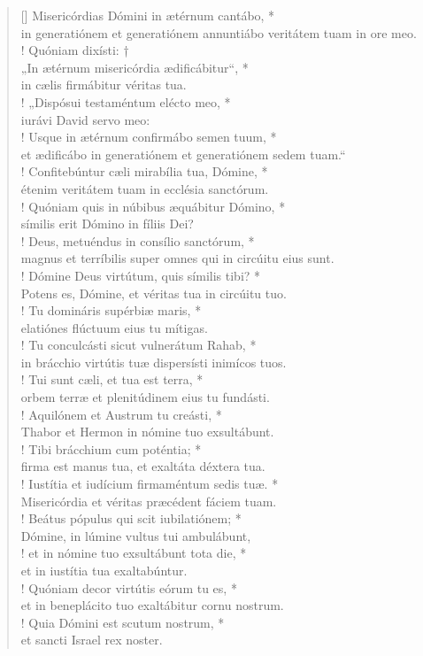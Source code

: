 \begin{verse}[\versewidth]
Misericórdias Dómini in ætérnum cantábo, *\\
in generatiónem et generatiónem annuntiábo veritátem tuam in ore meo.\\!
\vin Quóniam dixísti: †\\
\vin „In ætérnum misericórdia ædificábitur“, *\\
\vin in cælis firmábitur véritas tua.\\!
„Dispósui testaméntum elécto meo, *\\
iurávi David servo meo:\\!
\vin Usque in ætérnum confirmábo semen tuum, *\\
\vin et ædificábo in generatiónem et generatiónem sedem tuam.“\\!
Confitebúntur cæli mirabília tua, Dómine, *\\
étenim veritátem tuam in ecclésia sanctórum.\\!
\vin Quóniam quis in núbibus æquábitur Dómino, *\\
\vin símilis erit Dómino in fíliis Dei?\\!
Deus, metuéndus in consílio sanctórum, *\\
magnus et terríbilis super omnes qui in circúitu eius sunt.\\!
\vin Dómine Deus virtútum, quis símilis tibi? *\\
\vin Potens es, Dómine, et véritas tua in circúitu tuo.\\!
Tu domináris supérbiæ maris, *\\
elatiónes flúctuum eius tu mítigas.\\!
\vin Tu conculcásti sicut vulnerátum Rahab, *\\
\vin in brácchio virtútis tuæ dispersísti inimícos tuos.\\!
Tui sunt cæli, et tua est terra, *\\
orbem terræ et plenitúdinem eius tu fundásti.\\!
\vin Aquilónem et Austrum tu creásti, *\\
\vin Thabor et Hermon in nómine tuo exsultábunt.\\!
Tibi brácchium cum poténtia; *\\
firma est manus tua, et exaltáta déxtera tua.\\!
\vin Iustítia et iudícium firmaméntum sedis tuæ. *\\
\vin Misericórdia et véritas præcédent fáciem tuam.\\!
Beátus pópulus qui scit iubilatiónem; *\\
Dómine, in lúmine vultus tui ambulábunt,\\!
\vin et in nómine tuo exsultábunt tota die, *\\
\vin et in iustítia tua exaltabúntur.\\!
Quóniam decor virtútis eórum tu es, *\\
et in beneplácito tuo exaltábitur cornu nostrum.\\!
\vin Quia Dómini est scutum nostrum, *\\
\vin et sancti Israel rex noster.\\
\end{verse}
